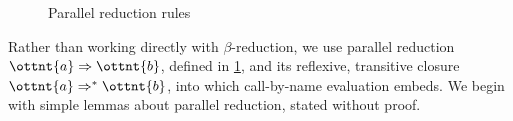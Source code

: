 \documentclass[a4paper,UKenglish,cleveref,autoref,thm-restate]{lipics-v2021}
\begin{document}
\begin{figure}
\caption{Parallel reduction rules}
\label{fig:par}
\end{figure}

Rather than working directly with $\beta$-reduction,
we use parallel reduction $ \ottnt{a}  \Rightarrow  \ottnt{b} $,
defined in \cref{fig:par},
and its reflexive, transitive closure $ \ottnt{a}  \Rightarrow^\ast  \ottnt{b} $,
into which call-by-name evaluation embeds.
We begin with simple lemmas about parallel reduction, stated without proof.
\end{document}
